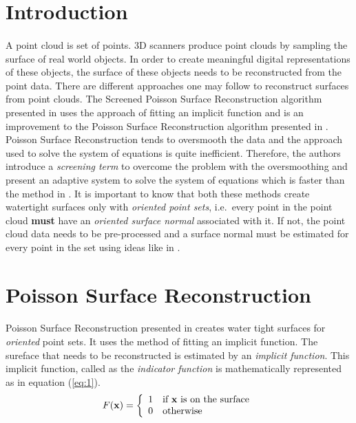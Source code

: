\documentclass[12pt,a4paper]{article}
\begin{document}


\section{Introduction} \label{sec:Intro}
\paragraph{}
A point cloud is set of points. 3D scanners produce point clouds by sampling the surface of real world objects. In order to create meaningful digital representations of these objects, the surface of these objects needs to be reconstructed from the point data. There are different approaches one may follow to reconstruct surfaces from point clouds. The Screened Poisson Surface Reconstruction algorithm presented in \cite{ScreenedPoisson} uses the approach of fitting an implicit function and is an improvement to the Poisson Surface Reconstruction algorithm presented in \cite{Poisson}. Poisson Surface Reconstruction tends to oversmooth the data and the approach used to solve the system of equations is quite inefficient. Therefore, the authors introduce a \textit{screening term} to overcome the problem with the oversmoothing and present an adaptive system to solve the system of equations which is faster than the method in \cite{Poisson}. It is important to know that both these methods create watertight surfaces only with \textit{oriented point sets}, i.e.\ every point in the point cloud \textbf{must} have an \textit{oriented surface normal} associated with it. If not, the point cloud data needs to be pre-processed and a surface normal must be estimated for every point in the set using ideas like in \cite{SurNormal}.

   
\section{Poisson Surface Reconstruction} \label{sec:PSR}
\paragraph{}
Poisson Surface Reconstruction presented in \cite{Poisson} creates water tight surfaces for \textit{oriented} point sets. It uses the method of fitting an implicit function. The sureface that needs to be reconstructed is estimated by an \textit{implicit function}. This implicit function, called as the \textit{indicator function} is mathematically represented as in equation (\ref{eq:1}).
\begin{equation}
\label{eq:1}
  F(\mathbf{x}) = \left\{ \begin{array}{ll} 1 & \mbox{if } \mathbf{x} \mbox{ is on the surface} \\ 0 & \mbox{otherwise} \end{array} \right.
\end{equation}
\end{document}
